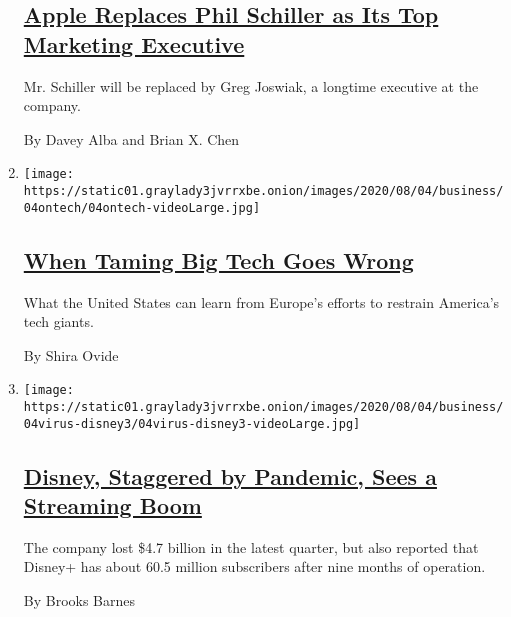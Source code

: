 \begin{enumerate}
  \hypertarget{apple-replaces-phil-schiller-as-its-top-marketing-executive}{%
  \subsection{\texorpdfstring{\href{/2020/08/04/technology/apple-schiller-marketing-executive-departure.html}{Apple
  Replaces Phil Schiller as Its Top Marketing
  Executive}}{Apple Replaces Phil Schiller as Its Top Marketing Executive}}\label{apple-replaces-phil-schiller-as-its-top-marketing-executive}}

  Mr. Schiller will be replaced by Greg Joswiak, a longtime executive at
  the company.

  By Davey Alba and Brian X. Chen
\item
  \texttt{[image: https://static01.graylady3jvrrxbe.onion/images/2020/08/04/business/04ontech/04ontech-videoLarge.jpg]}

  \hypertarget{when-taming-big-tech-goes-wrong}{%
  \subsection{\texorpdfstring{\href{/2020/08/04/technology/europe-big-tech.html}{When
  Taming Big Tech Goes
  Wrong}}{When Taming Big Tech Goes Wrong}}\label{when-taming-big-tech-goes-wrong}}

  What the United States can learn from Europe's efforts to restrain
  America's tech giants.

  By Shira Ovide
\item
  \texttt{[image: https://static01.graylady3jvrrxbe.onion/images/2020/08/04/business/04virus-disney3/04virus-disney3-videoLarge.jpg]}

  \hypertarget{disney-staggered-by-pandemic-sees-a-streaming-boom}{%
  \subsection{\texorpdfstring{\href{/2020/08/04/business/media/disney-earnings-coronavirus.html}{Disney,
  Staggered by Pandemic, Sees a Streaming
  Boom}}{Disney, Staggered by Pandemic, Sees a Streaming Boom}}\label{disney-staggered-by-pandemic-sees-a-streaming-boom}}

  The company lost \$4.7 billion in the latest quarter, but also
  reported that Disney+ has about 60.5 million subscribers after nine
  months of operation.

  By Brooks Barnes
\end{enumerate}


